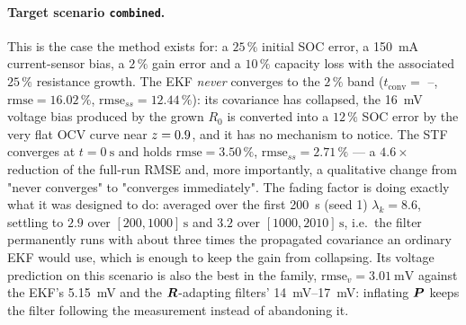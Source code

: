 \paragraph{Target scenario \texttt{combined}.}  This is the case the method exists for: a $25\,\%$
initial SOC error, a \SI{150}{\milli\ampere} current-sensor bias, a $2\,\%$ gain error and a
$10\,\%$ capacity loss with the associated $25\,\%$ resistance growth.  The EKF \emph{never}
converges to the $2\,\%$ band ($t_\mathrm{conv}=$ --, $\mathrm{rmse}=16.02\,\%$,
$\mathrm{rmse}_{ss}=12.44\,\%$): its covariance has collapsed, the \SI{16}{\milli\volt} voltage bias
produced by the grown $R_0$ is converted into a $12\,\%$ SOC error by the very flat OCV curve near
$z=0.9$, and it has no mechanism to notice.  The STF converges at $t=\SI{0}{\second}$ and holds
$\mathrm{rmse}=3.50\,\%$, $\mathrm{rmse}_{ss}=2.71\,\%$ --- a $4.6\times$ reduction of the full-run
RMSE and, more importantly, a qualitative change from "never converges" to "converges immediately".
The fading factor is doing exactly what it was designed to do: averaged over the first
\SI{200}{\second} (seed 1) $\lambda_k=8.6$, settling to $2.9$ over $[200,1000]\,\si{\second}$ and
$3.2$ over $[1000,2010]\,\si{\second}$, i.e.\ the filter permanently runs with about three times the
propagated covariance an ordinary EKF would use, which is enough to keep the gain from collapsing.
Its voltage prediction on this scenario is also the best in the family, $\mathrm{rmse}_v =
\SI{3.01}{\milli\volt}$ against the EKF's \SI{5.15}{\milli\volt} and the $\bm{R}$-adapting filters'
\SI{14}{\milli\volt}--\SI{17}{\milli\volt}: inflating $\bm{P}$ keeps the filter following the
measurement instead of abandoning it.

